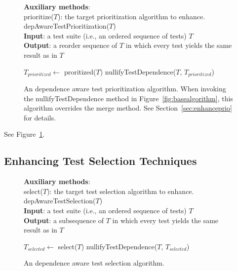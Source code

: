 \begin{figure}[t!]
	\textbf{Auxiliary methods}: \\
    prioritize($\mathit{T}$): the target prioritization algorithm to enhance.\\

    \vspace{-3mm}
	depAwareTestPrioritization($\mathit{T}$)\\
	\textbf{Input}: a test suite (i.e., an ordered sequence of
    tests) $\mathit{T}$\\
	\textbf{Output}: a reorder sequence of $\mathit{T}$ in which every test
    yields the same result as in $\mathit{T}$\\
	 \begin{algorithmic}[1]
	 	\vspace{-5mm}
        \STATE $\mathit{T_{prioritized}} \leftarrow$ proritized($\mathit{T}$)
        \RETURN nullifyTestDependence($\mathit{T}$, $\mathit{T_{prioritized}}$)
	\end{algorithmic}
	\vspace{-3mm}
	\caption {
        An dependence aware test prioritization algorithm. When invoking
        the nullifyTestDependence method in Figure~\ref{fig:basealgorithm},
        this algorithm overrides the merge method. See Section~\ref{sec:enhanceprio}
        for details.
	}
	\label{fig:copetestprio}
\end{figure}

See Figure~\ref{fig:copetestprio}.

\subsection{Enhancing Test Selection Techniques}

\begin{figure}[t!]
	\textbf{Auxiliary methods}: \\
    select($\mathit{T}$): the target test selection algorithm to enhance.\\

    \vspace{-3mm}
	depAwareTestSelection($\mathit{T}$)\\
	\textbf{Input}: a test suite (i.e., an ordered sequence of
    tests) $\mathit{T}$\\
	\textbf{Output}: a subsequence of $\mathit{T}$ in which every test
    yields the same result as in $\mathit{T}$\\
	 \begin{algorithmic}[1]
	 	\vspace{-5mm}
        \STATE $\mathit{T_{selected}} \leftarrow$ select($\mathit{T}$)
        \RETURN nullifyTestDependence($\mathit{T}$, $\mathit{T_{selected}}$)
	\end{algorithmic}
	\vspace{-3mm}
	\caption {
        An dependence aware test selection algorithm. 
	}
	\label{fig:copetestsel}
\end{figure}

